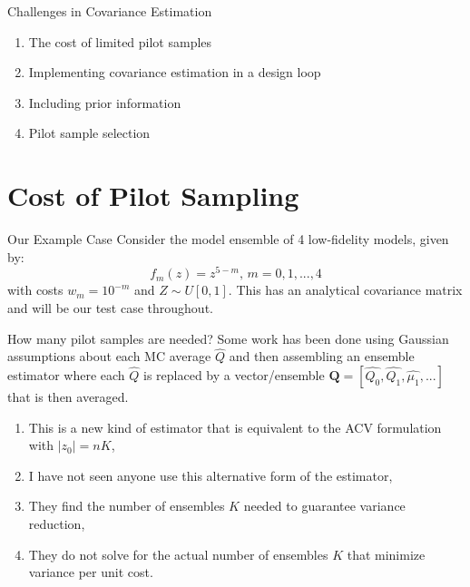 \documentclass[usenames,dvipsnames]{beamer}
\theoremstyle{definition}
\let\oldcite=\cite
\renewcommand{\cite}[2][]{\textcolor{green}{\oldcite[#1]{#2}}}
\begin{document}
\begin{frame}{Challenges in Covariance Estimation}
    \begin{enumerate}
        \item The cost of limited pilot samples
        \item Implementing covariance estimation in a design loop
        \item Including prior information
        \item Pilot sample selection
    \end{enumerate}
\end{frame}

\section[Pilot Sampling]{Cost of Pilot Sampling}
\begin{frame}{Our Example Case}
    Consider the model ensemble of 4 low-fidelity models, given by:
    \begin{equation}
        f_{m}(z) = z^{5-m}, \, m=0,1,...,4
    \end{equation}
    with costs $w_{m}=10^{-m}$ and $Z \sim U[0,1]$. This has an analytical covariance matrix and will be our test case throughout.
\end{frame}

\begin{frame}{How many pilot samples are needed?}
    Some work \cite{pham_ensemble_2022} has been done using Gaussian assumptions about each MC average $\hat{Q}$ and then assembling an ensemble estimator where each $\hat{Q}$ is replaced by a vector/ensemble $\mathbf{Q} = [\hat{Q_{0}},\hat{Q_{1}},\hat{\mu_{1}},...]$ that is then averaged.
    \begin{enumerate}
        \item This is a new kind of estimator that is equivalent to the ACV formulation with $|z_{0}| = nK$,
        \item I have not seen anyone use this alternative form of the estimator,
        \item They find the number of ensembles $K$ needed to guarantee variance reduction,
        \item They do not solve for the actual number of ensembles $K$ that minimize variance per unit cost.
    \end{enumerate}
\end{frame}
\end{document}

